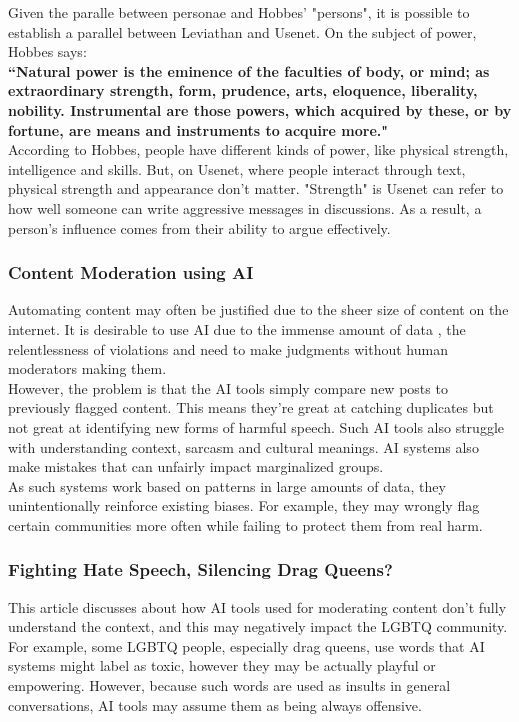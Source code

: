 \documentclass[a4paper]{article}
\begin{document}
\noindent Given the paralle between personae and Hobbes' "persons", it is possible to establish a parallel between
Leviathan and Usenet. On the subject of power, Hobbes says: \\

\textbf{``Natural power is the eminence of the faculties of body, or mind; as extraordinary strength, form, prudence,
arts, eloquence, liberality, nobility. Instrumental are those powers, which acquired by these, or by fortune, are
means and instruments to acquire more."} \\

\noindent According to Hobbes, people have different kinds of power, like physical strength, intelligence and skills. 
But, on Usenet, where people interact through text, physical strength and appearance don't matter. "Strength" is 
Usenet can refer to how well someone can write aggressive messages in discussions. As a result, a person's influence 
comes from their ability to argue effectively.

\subsubsection{Content Moderation using AI}
Automating content may often be justified due to the sheer size of content on the internet. It is desirable to use AI
due to the immense amount of data , the relentlessness of violations and need to make judgments without human 
moderators making them. \\

\noindent However, the problem is that the AI tools simply compare new posts to previously flagged content. This means
they're great at catching duplicates but not great at identifying new forms of harmful speech. Such AI tools also 
struggle with understanding context, sarcasm and cultural meanings. AI systems also make mistakes that can unfairly 
impact marginalized groups. \\

\noindent As such systems work based on patterns in large amounts of data, they unintentionally 
reinforce existing biases. For example, they may wrongly flag certain communities more often while failing to protect 
them from real harm.

\subsubsection{Fighting Hate Speech, Silencing Drag Queens?}
This article discusses about how AI tools used for moderating content don't fully understand the context, and this may
negatively impact the LGBTQ community. For example, some LGBTQ people, especially drag queens, use words that AI 
systems might label as toxic, however they may be actually playful or empowering. However, because such words are 
used as insults in general conversations, AI tools may assume them as being always offensive.
\end{document}
